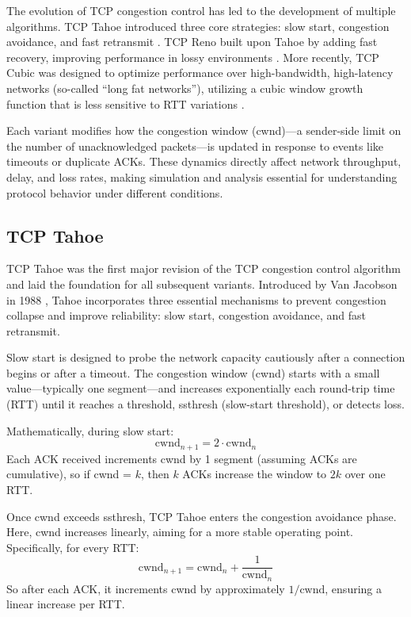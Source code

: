 \documentclass[conference]{IEEEtran}
\begin{document}
The evolution of TCP congestion control has led to the development of multiple algorithms. 
TCP Tahoe introduced three core strategies: slow start, congestion avoidance, and fast retransmit \cite{b2}. 
TCP Reno built upon Tahoe by adding fast recovery, improving performance in lossy environments \cite{b5}. 
More recently, TCP Cubic was designed to optimize performance over high-bandwidth, high-latency networks (so-called “long fat networks”), utilizing a cubic window growth function that is less sensitive to RTT variations \cite{b3}.

Each variant modifies how the congestion window (cwnd)—a sender-side limit on the number of unacknowledged packets—is updated in response to events like timeouts or duplicate ACKs. 
These dynamics directly affect network throughput, delay, and loss rates, making simulation and analysis essential for understanding protocol behavior under different conditions.

\subsection{TCP Tahoe}
TCP Tahoe was the first major revision of the TCP congestion control algorithm and laid the foundation for all subsequent variants. 
Introduced by Van Jacobson in 1988 \cite{b2}, Tahoe incorporates three essential mechanisms to prevent congestion collapse and improve reliability: slow start, congestion avoidance, and fast retransmit.

Slow start is designed to probe the network capacity cautiously after a connection begins or after a timeout. 
The congestion window (cwnd) starts with a small value—typically one segment—and increases exponentially each round-trip time (RTT) until it reaches a threshold, ssthresh (slow-start threshold), or detects loss.

Mathematically, during slow start:
\begin{equation}
    \text{cwnd}_{n+1} = 2\cdot \text{cwnd}_n \label{eq:1}
\end{equation}
Each ACK received increments cwnd by 1 segment (assuming ACKs are cumulative), so if cwnd = $k$, then $k$ ACKs increase the window to $2k$ over one RTT.

Once cwnd exceeds ssthresh, TCP Tahoe enters the congestion avoidance phase. 
Here, cwnd increases linearly, aiming for a more stable operating point. Specifically, for every RTT:
\begin{equation}
    \text{cwnd}_{n+1} = \text{cwnd}_n + \frac{1}{\text{cwnd}_n} \label{eq:2}
\end{equation}
So after each ACK, it increments cwnd by approximately $1/\text{cwnd}$, ensuring a linear increase per RTT.
\end{document}

